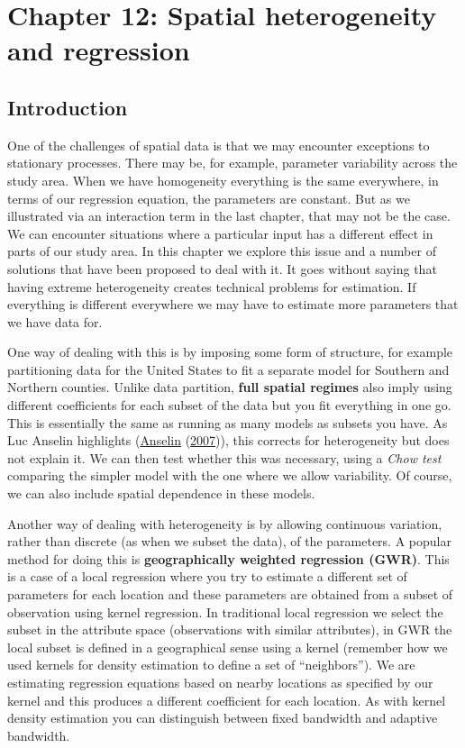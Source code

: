 \documentclass[
  krantz2]{krantz}
\begin{document}
\hypertarget{chapter-12-spatial-heterogeneity-and-regression}{%
\chapter{Chapter 12: Spatial heterogeneity and regression}\label{chapter-12-spatial-heterogeneity-and-regression}}

\hypertarget{introduction-10}{%
\section{Introduction}\label{introduction-10}}

One of the challenges of spatial data is that we may encounter exceptions to stationary processes. There may be, for example, parameter variability across the study area. When we have homogeneity everything is the same everywhere, in terms of our regression equation, the parameters are constant. But as we illustrated via an interaction term in the last chapter, that may not be the case. We can encounter situations where a particular input has a different effect in parts of our study area. In this chapter we explore this issue and a number of solutions that have been proposed to deal with it. It goes without saying that having extreme heterogeneity creates technical problems for estimation. If everything is different everywhere we may have to estimate more parameters that we have data for.

One way of dealing with this is by imposing some form of structure, for example partitioning data for the United States to fit a separate model for Southern and Northern counties. Unlike data partition, \textbf{full spatial regimes} also imply using different coefficients for each subset of the data but you fit everything in one go. This is essentially the same as running as many models as subsets you have. As Luc Anselin highlights (\protect\hyperlink{ref-Anselin_2007}{Anselin} (\protect\hyperlink{ref-Anselin_2007}{2007})), this corrects for heterogeneity but does not explain it. We can then test whether this was necessary, using a \emph{Chow test} comparing the simpler model with the one where we allow variability. Of course, we can also include spatial dependence in these models.

Another way of dealing with heterogeneity is by allowing continuous variation, rather than discrete (as when we subset the data), of the parameters. A popular method for doing this is \textbf{geographically weighted regression (GWR)}. This is a case of a local regression where you try to estimate a different set of parameters for each location and these parameters are obtained from a subset of observation using kernel regression. In traditional local regression we select the subset in the attribute space (observations with similar attributes), in GWR the local subset is defined in a geographical sense using a kernel (remember how we used kernels for density estimation to define a set of ``neighbors''). We are estimating regression equations based on nearby locations as specified by our kernel and this produces a different coefficient for each location. As with kernel density estimation you can distinguish between fixed bandwidth and adaptive bandwidth.
\end{document}

